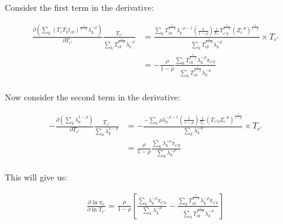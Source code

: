 \documentclass[10pt]{article}
\begin{document}
Consider the first term in the derivative:

\begin{align*}
    \frac{\partial \left( \sum_{k}^{} (T_c T_k t_{ck})^{\frac{1}{1 - \rho}} \lambda_k^{- \rho} \right)}{\partial T_{c'}} \frac{T_{c'}}{\sum_{k}^{} T_{ck}^{\frac{1}{1 - \rho}} \lambda_k^{- \rho}} & = \frac{\sum_{k}^{} T_{ck}^{\frac{1}{1 - \rho}} \lambda_k^{-\rho - 1} \left( \frac{1}{1 - \rho} \right) \frac{1}{T_{c'}} T_{c'k}^{\frac{1}{1 - \rho}} (Z_c^{- \theta})^{\frac{1}{1 - \rho}}}{\sum_{k}^{} T_{ck}^{\frac{1}{1 - \rho}} \lambda_k^{- \rho}} \times T_{c'} \\
                                                                                                                                                                                                   & = - \frac{\rho}{1 - \rho} \frac{\sum_{k}^{}T_{ck}^{\frac{1}{1 - \rho}} \lambda_k^{- \rho} \pi_{c'k}}{\sum_{k}^{} T_{ck}^{\frac{1}{1 - \rho}} \lambda_k^{- \rho}}                                                                                                       \\
\end{align*}

Now consider the second term in the derivative:

\begin{align*}
    - \frac{\partial \left( \sum_{k}^{} \lambda_k^{1 - \rho} \right)}{\partial T_{c'}} \frac{T_{c'}}{\sum_{k}^{} \lambda_k^{1 - \rho}} & = - \frac{- \sum_{k}^{} \rho \lambda_k^{- \rho - 1} \left( \frac{1}{1 - \rho} \right) \frac{1}{T_{c'}} (T_{c'k} Z_c^{- \theta})^{\frac{1}{1 - \rho}}}{\sum_{k}^{} \lambda_k^{- \theta}} \times T_{c'} \\
                                                                                                                                       & = \frac{\rho}{1 - \rho} \frac{\sum_{k}^{} \lambda_k^{- \rho} \pi_{c'k} }{\sum_{k}^{} \lambda_k^{- \rho}}                                                                                              \\
\end{align*}

This will give us:

\begin{align*}
    \frac{\partial \ln \pi_c}{\partial \ln T_{c'}} = \frac{\rho}{1 - \rho} \left[ \frac{\sum_{k}^{} \lambda_k^{- \rho} \pi_{c'k}}{\sum_{k}^{} \lambda_k^{- \rho}} - \frac{\sum_{k}^{} T_{ck}^{\frac{1}{1 - \rho}} \lambda_k^{-\rho} \pi_{c'k}}{\sum_{k}^{} T_{ck}^{\frac{1}{1 - \rho}} \lambda_k^{-\rho}} \right]
\end{align*}
\end{document}
